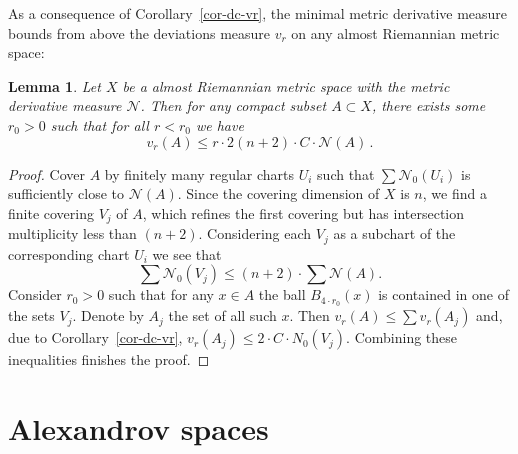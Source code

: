 \documentclass[12pt,leqno,intlimits]{amsart}
\numberwithin{equation}{section}
\newtheorem{lem}[thm]{Lemma}
\theoremstyle{definition}
\theoremstyle{remark}
\newcommand{\cref}[1]{Corollary~\ref{#1}}
\begin{document}
As a consequence of \cref{cor-dc-vr}, the minimal metric derivative measure bounds from above the deviations measure $v_r$
on any almost Riemannian metric space:

\begin{lem} \label{cor-mu-dc}
Let $X$ be a almost Riemannian metric space with the metric derivative measure $\mathcal N$.
Then for any compact subset $A\subset X$, there exists some $r_0>0$ such that for all
$r<r_0$ we have $$v_r (A) \leq r\cdot 2 (n+2)\cdot C\cdot \mathcal N (A)\,. $$
\end{lem}

\begin{proof}
Cover $A$ by finitely many regular charts $U_i$ such that $\sum \mathcal N_0 (U_i)$ is sufficiently close to $\mathcal N (A)$.
Since the covering dimension of $X$ is $n$, we find a finite covering $V_j$ of $A$, which refines the first covering but has intersection multiplicity less than $(n+2)$. Considering each $V_j$ as a subchart of the corresponding chart $U_i$ we see that
$$\sum \mathcal N_0 (V_j) \leq (n+2)\cdot \sum \mathcal N(A)  .$$
Consider $r_0>0$ such that for any $x\in A$ the ball $B_{4{\cdot}r_0} (x)$ is contained in one of the sets $V_j$. Denote by $A_j$ the set of all such $x$.
Then $v_r (A) \leq \sum v_r (A_j)$ and, due to \cref{cor-dc-vr}, $v_r (A_j) \leq 2 \cdot C\cdot N_0 (V_j)$.
Combining these inequalities finishes the proof.
\end{proof}

\section{Alexandrov spaces} \label{sec:Alex}
\end{document}
